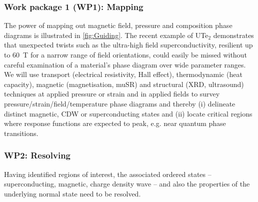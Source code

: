 \subsubsection*{Work package 1 (WP1): Mapping} 
\noindent The power of mapping out magnetic field, pressure and composition phase diagrams is illustrated in \autoref{fig:Guiding}. The recent example of UTe$_2$ demonstrates that unexpected twists such as the ultra-high field superconductivity, resilient up to \SI{60}{\tesla} for a narrow range of field orientations, could easily be missed without careful examination of a material's phase diagram over wide parameter ranges. 
We will use transport (electrical resistivity, Hall effect), thermodynamic (heat capacity), magnetic (magnetisation, muSR) and structural (XRD, ultrasound) techniques at applied pressure or strain and in applied fields to survey pressure/strain/field/temperature phase diagrams and thereby  (i) delineate distinct magnetic, CDW or superconducting states and (ii) locate critical regions where response functions are expected to peak, e.g. near quantum phase transitions.






\subsubsection*{WP2: Resolving}
\noindent
Having identified regions of interest, the associated ordered states -- superconducting, magnetic, charge density wave -- and also the properties of the underlying normal state need to be resolved. 

